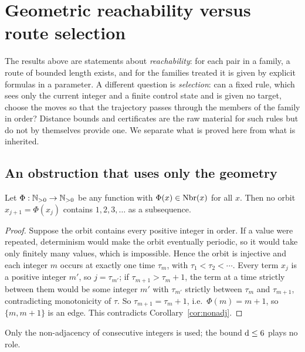 \section{Geometric reachability versus route selection}\label{sec:selection}
The results above are statements about \emph{reachability}: for each pair in a family, a route of bounded length exists, and for the families treated it is given by explicit formulas in a parameter. A different question is \emph{selection}: can a fixed rule, which sees only the current integer and a finite control state and is given no target, choose the moves so that the trajectory passes through the members of the family in order? Distance bounds and certificates are the raw material for such rules but do not by themselves provide one. We separate what is proved here from what is inherited.

\subsection{An obstruction that uses only the geometry}
\begin{theorem}\label{thm:memoryless}
Let $\Phi:\mathbb{N}_{>0}\to\mathbb{N}_{>0}$ be any function with $\Phi(x)\in\operatorname{Nbr}(x)$ for all $x$. Then no orbit $x_{j+1}=\Phi(x_j)$ contains $1,2,3,\dots$ as a subsequence.
\end{theorem}
\begin{proof} Suppose the orbit contains every positive integer in order. If a value were repeated, determinism would make the orbit eventually periodic, so it would take only finitely many values, which is impossible. Hence the orbit is injective and each integer $m$ occurs at exactly one time $\tau_m$, with $\tau_1<\tau_2<\cdots$. Every term $x_j$ is a positive integer $m'$, so $j=\tau_{m'}$; if $\tau_{m+1}>\tau_m+1$, the term at a time strictly between them would be some integer $m'$ with $\tau_{m'}$ strictly between $\tau_m$ and $\tau_{m+1}$, contradicting monotonicity of $\tau$. So $\tau_{m+1}=\tau_m+1$, i.e.\ $\Phi(m)=m+1$, so $\{m,m+1\}$ is an edge. This contradicts Corollary~\ref{cor:nonadj}. \end{proof}
Only the non-adjacency of consecutive integers is used; the bound $\operatorname{d}\le6$ plays no role.

